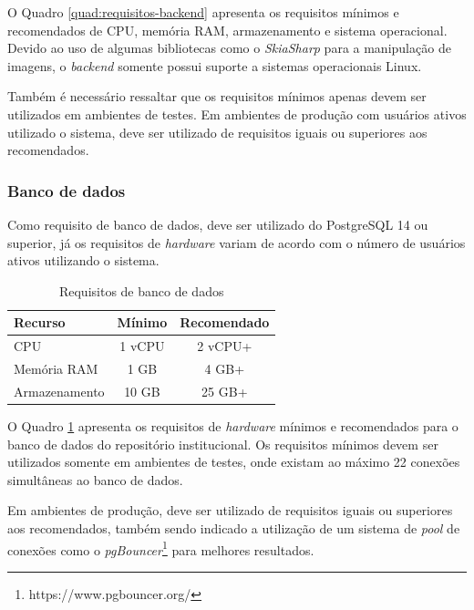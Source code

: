 O Quadro \ref{quad:requisitos-backend} apresenta os requisitos mínimos e recomendados de
CPU, memória RAM, armazenamento e sistema operacional. Devido ao uso de algumas bibliotecas
como o \emph{SkiaSharp} para a manipulação de imagens, o \emph{backend} somente possui
suporte a sistemas operacionais Linux.

Também é necessário ressaltar que os requisitos mínimos apenas devem ser utilizados
em ambientes de testes. Em ambientes de produção com usuários ativos utilizado
o sistema, deve ser utilizado de requisitos iguais ou superiores aos recomendados.

\subsubsection{Banco de dados}

Como requisito de banco de dados, deve ser utilizado do PostgreSQL 14 ou superior,
já os requisitos de \emph{hardware} variam de acordo com o número de usuários ativos
utilizando o sistema.

\begin{table}[H]
    \caption{Requisitos de banco de dados}
    \label{quad:requisitos-database}
    \begin{tabular}{|p{9.7cm}|c|c|}
        \hline
        {\textbf{Recurso}} & {\textbf{Mínimo}} & {\textbf{Recomendado}} \\ \hline
        {CPU}              & {1 vCPU}          & {2 vCPU+ }             \\ \hline
        {Memória RAM}      & {1 GB}            & {4 GB+ }               \\ \hline
        {Armazenamento}    & {10 GB}           & {25 GB+ }              \\ \hline
    \end{tabular}
\end{table}

O Quadro \ref{quad:requisitos-database} apresenta os requisitos de \emph{hardware}
mínimos e recomendados para o banco de dados do repositório institucional.
Os requisitos mínimos devem ser utilizados somente em ambientes de testes,
onde existam ao máximo 22 conexões simultâneas ao banco de dados.

Em ambientes de produção, deve ser utilizado de requisitos iguais ou superiores
aos recomendados, também sendo indicado a utilização de um sistema de \emph{pool}
de conexões como o \emph{pgBouncer}\footnote{https://www.pgbouncer.org/}
para melhores resultados.


